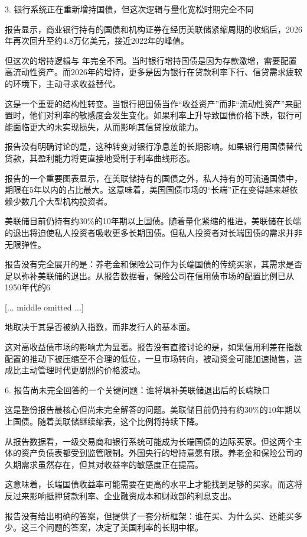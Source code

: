 \documentclass[11pt]{ctexart}
\begin{document}
3. 银行系统正在重新增持国债，但这次逻辑与量化宽松时期完全不同

报告显示，商业银行持有的国债和机构证券在经历美联储紧缩周期的收缩后，2026年再次回升至约4.8万亿美元，接近2022年的峰值。

但这次的增持逻辑与 年完全不同。当时银行增持国债是因为存款激增，需要配置高流动性资产。而2026年的增持，更多是因为银行在贷款利率下行、信贷需求疲软的环境下，主动寻求收益替代。

这是一个重要的结构性转变。当银行把国债当作“收益资产”而非“流动性资产”来配置时，他们对利率的敏感度会发生变化。如果利率上升导致国债价格下跌，银行可能面临更大的未实现损失，从而影响其信贷投放能力。

报告没有明确讨论的是，这种转变对银行净息差的长期影响。如果银行用国债替代贷款，其盈利能力将更直接地受制于利率曲线形态。

报告的一个重要图表显示，在美联储持有的国债之外，私人持有的可流通国债中，期限在5年以内的占比最大。这意味着，美国国债市场的“长端”正在变得越来越依赖少数几个大型机构投资者。

美联储目前仍持有约30\%的10年期以上国债。随着量化紧缩的推进，美联储在长端的退出将迫使私人投资者吸收更多长期国债。但私人投资者对长端国债的需求并非无限弹性。

报告没有完全展开的是：养老金和保险公司作为长端国债的传统买家，其需求是否足以弥补美联储的退出。从报告数据看，保险公司在信用债市场的配置比例已从1950年代的6

[... middle omitted ...]

地取决于其是否被纳入指数，而非发行人的基本面。

这对高收益债市场的影响尤为显著。报告没有直接讨论的是，如果信用利差在指数配置的推动下被压缩至不合理的低位，一旦市场转向，被动资金可能加速抛售，造成比主动管理时代更剧烈的价格波动。

6. 报告尚未完全回答的一个关键问题：谁将填补美联储退出后的长端缺口

这是整份报告最核心但尚未完全解答的问题。美联储目前仍持有约30\%的10年期以上国债。随着美联储继续缩表，这个比例将持续下降。

从报告数据看，一级交易商和银行系统可能成为长端国债的边际买家。但这两个主体的资产负债表都受到监管限制。外国央行的增持意愿有限。养老金和保险公司的久期需求虽然存在，但其对收益率的敏感度正在提高。

这意味着，长端国债收益率可能需要在更高的水平上才能找到足够的买家。而这将反过来影响抵押贷款利率、企业融资成本和财政部的利息支出。

报告没有给出明确的答案，但提供了一套分析框架：谁在买、为什么买、还能买多少。这三个问题的答案，决定了美国利率的长期中枢。
\end{document}
